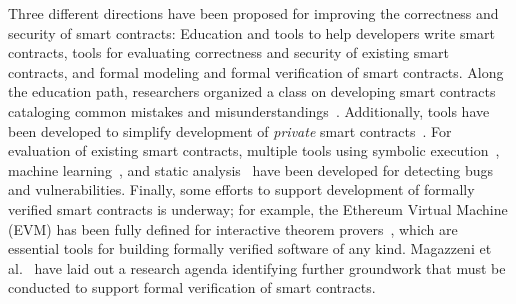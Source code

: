 
Three different directions have been proposed for improving the correctness and security of smart contracts:  Education and tools to help developers write smart contracts, tools for evaluating correctness and security of existing smart contracts, and formal modeling and formal verification of smart contracts. Along the education path, researchers organized a class on developing smart contracts cataloging common mistakes and misunderstandings~\cite{FC:DAKMS16}. Additionally, tools have been developed to simplify development of \emph{private} smart contracts~\cite{SP:KMSWP16}. For evaluation of existing smart contracts, multiple tools using symbolic execution~\cite{CCS:LCOSH16}, machine learning~\cite{arxiv:Huang18}, and static analysis~\cite{CCS:BDFGGK+16,NDSS:KGDS18} have been developed for detecting bugs and vulnerabilities. Finally, some efforts to support development of formally verified smart contracts is underway; for example, the Ethereum Virtual Machine (EVM) has been fully defined for interactive theorem provers~\cite{Hirai17}, which are essential tools for building formally verified software of any kind. Magazzeni et al.~\cite{Magazzeni17} have laid out a research agenda identifying further groundwork that must be conducted to support formal verification of smart contracts.



